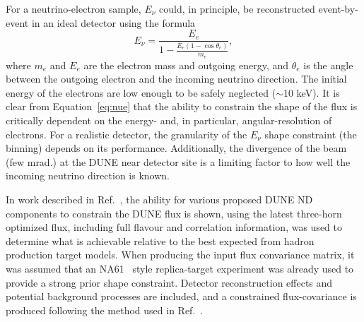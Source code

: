 For a neutrino-electron sample, $E_{\nu}$ could, in principle, be reconstructed event-by-event in an ideal detector using the formula
\begin{equation}
  E_{\nu} = \frac{E_{e}}{1 - \frac{E_{e}(1-\cos\theta_{e})}{m_{e}}},
\label{eq:nue}
\end{equation}
\noindent where $m_e$ and $E_e$ are the electron mass and outgoing energy, and $\theta_e$ is the angle between the outgoing electron and the incoming neutrino direction. The initial energy of the electrons are low enough to be safely neglected ($\sim$10 keV). It is clear from Equation~\ref{eq:nue} that the ability to constrain the shape of the flux is critically dependent on the energy- and, in particular, angular-resolution of electrons. For a realistic detector, the granularity of the $E_{\nu}$ shape constraint (the binning) depends on its performance. Additionally, the divergence of the beam (few mrad.) at the DUNE near detector site is a limiting factor to how well the incoming neutrino direction is known.

In work described in Ref.~\cite{dune_nue}, the ability for various proposed DUNE ND components to constrain the DUNE flux is shown, using the latest three-horn optimized flux, including full flavour and correlation information, was used to determine what is achievable relative to the best expected from hadron production target models. When producing the input flux convariance matrix, it was assumed that an NA61~\cite{Laszlo:2009vg} style replica-target experiment was already used to provide a strong prior shape constraint. Detector reconstruction effects and potential background processes are included, and a constrained flux-covariance is produced following the method used in Ref.~\cite{Park:2015eqa}.

